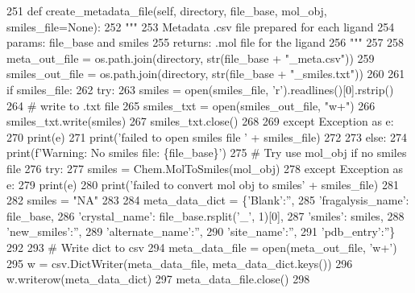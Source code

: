 \begin{DoxyCode}
251     \textcolor{keyword}{def }create\_metadata\_file(self, directory, file\_base, mol\_obj, smiles\_file=None):
252         \textcolor{stringliteral}{"""}
253 \textcolor{stringliteral}{        Metadata .csv file prepared for each ligand}
254 \textcolor{stringliteral}{        params: file\_base and smiles}
255 \textcolor{stringliteral}{        returns: .mol file for the ligand}
256 \textcolor{stringliteral}{        """}
257 
258         meta\_out\_file = os.path.join(directory, str(file\_base + \textcolor{stringliteral}{"\_meta.csv"}))
259         smiles\_out\_file = os.path.join(directory, str(file\_base + \textcolor{stringliteral}{"\_smiles.txt"}))
260 
261         \textcolor{keywordflow}{if} smiles\_file:
262             \textcolor{keywordflow}{try}:
263                 smiles = open(smiles\_file, \textcolor{stringliteral}{'r').readlines()[0].rstrip()}
264 \textcolor{stringliteral}{                }\textcolor{comment}{# write to .txt file}
265                 smiles\_txt = open(smiles\_out\_file, \textcolor{stringliteral}{"w+"})
266                 smiles\_txt.write(smiles)
267                 smiles\_txt.close()
268 
269             \textcolor{keywordflow}{except} Exception \textcolor{keyword}{as} e:
270                 print(e)
271                 print(\textcolor{stringliteral}{'failed to open smiles file '} + smiles\_file)
272 
273         \textcolor{keywordflow}{else}:
274             print(f\textcolor{stringliteral}{'Warning: No smiles file: \{file\_base\}'})
275             \textcolor{comment}{# Try use mol\_obj if no smiles file}
276             \textcolor{keywordflow}{try}:
277                 smiles = Chem.MolToSmiles(mol\_obj)
278             \textcolor{keywordflow}{except} Exception \textcolor{keyword}{as} e:
279                 print(e)
280                 print(\textcolor{stringliteral}{'failed to convert mol obj to smiles'} + smiles\_file)
281 
282                 smiles = \textcolor{stringliteral}{"NA"}
283 
284         meta\_data\_dict = \{\textcolor{stringliteral}{'Blank'}:\textcolor{stringliteral}{''},
285                           \textcolor{stringliteral}{'fragalysis\_name'}: file\_base,
286                           \textcolor{stringliteral}{'crystal\_name'}: file\_base.rsplit(\textcolor{stringliteral}{'\_'}, 1)[0],
287                           \textcolor{stringliteral}{'smiles'}: smiles,
288                           \textcolor{stringliteral}{'new\_smiles'}:\textcolor{stringliteral}{''},
289                           \textcolor{stringliteral}{'alternate\_name'}:\textcolor{stringliteral}{''},
290                           \textcolor{stringliteral}{'site\_name'}:\textcolor{stringliteral}{''},
291                           \textcolor{stringliteral}{'pdb\_entry'}:\textcolor{stringliteral}{''}\}
292 
293         \textcolor{comment}{# Write dict to csv}
294         meta\_data\_file = open(meta\_out\_file, \textcolor{stringliteral}{'w+'})
295         w = csv.DictWriter(meta\_data\_file, meta\_data\_dict.keys())
296         w.writerow(meta\_data\_dict)
297         meta\_data\_file.close()
298 
\end{DoxyCode}
